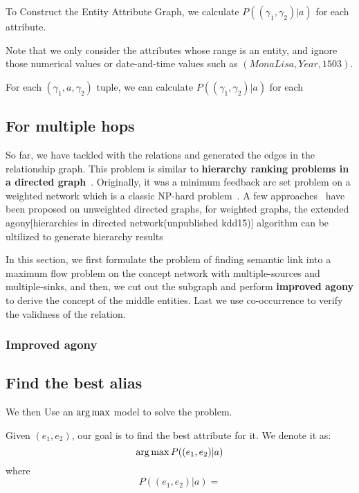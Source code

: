 To Construct the Entity Attribute Graph, we calculate $P((\gamma_{1},\gamma_{2}) |a)$ for each attribute.




Note that we only consider the attributes whose range is an entity, and ignore those numerical values or date-and-time values such as $( Mona Lisa, Year, 1503)$.





For each $(\gamma_{1},a,\gamma_{2})$ tuple, we can calculate $P((\gamma_{1},\gamma_{2}) |a)$ for each









\subsection{For multiple hops}

So far, we have tackled with the relations and generated the edges in the relationship graph.
This problem is similar to {\bf hierarchy ranking problems in a directed graph}~\cite{gupte2011finding}. Originally, it was a minimum feedback arc set problem on a weighted network which is a classic NP-hard problem~\cite{dinur2005hardness}. A few approaches~\cite{tatti2014faster} have been proposed on unweighted directed graphs, for weighted graphs, the extended agony[hierarchies in directed network(unpublished kdd15)] algorithm can be ultilized to generate hierarchy results 

In this section, we first formulate the problem of finding semantic link into a maximum flow problem on the concept network with multiple-sources and multiple-sinks, and then, we cut out the subgraph and perform {\bf improved agony} to derive the concept of the middle entities. Last we use co-occurrence to verify the validness of the relation.



\subsubsection{Improved agony}





\subsection{Find the best alias}

We then Use an $\operatorname*{arg\,max}$ model  to solve the problem.

Given $(e_1,e_2)$, our goal is to find the best attribute for it. We denote it as:
$$\operatorname*{arg\,max} P((e_1,e_2)|a) $$
where
$$P((e_1,e_2)|a)= $$


